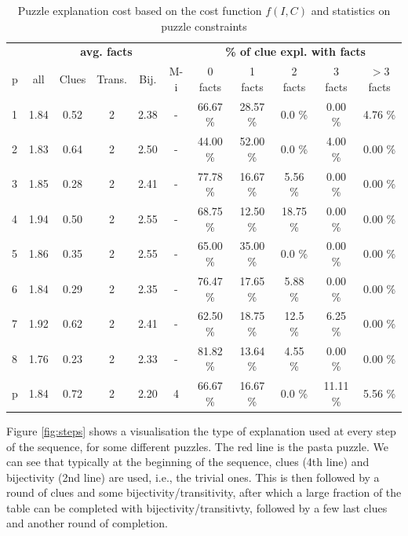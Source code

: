 \begin{table}
	\centering
\begin{tabular}{l|ccccc|ccccc}
    & \multicolumn{5}{c|}{\bf avg. facts} & \multicolumn{5}{c}{\bf \% of clue expl. with facts} \\
p & all & Clues & Trans. & Bij. & M-i & 0 facts & 1 facts & 2 facts & 3 facts &  $>$3 facts \\
\hline
1 &      1.84 &        0.52 &           2 &      2.38 &          - &      66.67 \% &      28.57 \% &        0.0 \% &        0.00 \% &         4.76 \% \\
2 &      1.83 &        0.64 &           2 &       2.50 &          - &       44.00 \% &       52.00 \% &        0.0 \% &        4.00 \% &          0.00 \% \\
3 &      1.85 &        0.28 &           2 &      2.41 &          - &      77.78 \% &      16.67 \% &       5.56 \% &        0.00 \% &          0.00 \% \\
4 &      1.94 &         0.50 &           2 &      2.55 &          - &      68.75 \% &       12.50 \% &      18.75 \% &        0.00 \% &          0.00 \% \\
5 &      1.86 &        0.35 &           2 &      2.55 &          - &       65.00 \% &       35.00 \% &        0.0 \% &        0.00 \% &          0.00 \% \\
6 &      1.84 &        0.29 &           2 &      2.35 &          - &      76.47 \% &      17.65 \% &       5.88 \% &        0.00 \% &          0.00 \% \\
7 &      1.92 &        0.62 &           2 &      2.41 &          - &       62.50 \% &      18.75 \% &       12.5 \% &       6.25 \% &          0.00 \% \\
8 &      1.76 &        0.23 &           2 &      2.33 &          - &      81.82 \% &      13.64 \% &       4.55 \% &        0.00 \% &          0.00 \% \\
p &      1.84 &        0.72 &           2 &       2.20 &          4 &      66.67 \% &      16.67 \% &        0.0 \% &      11.11 \% &         5.56 \% \\
\end{tabular}
\caption{Puzzle explanation cost based on the cost function $f(I, C)$ and statistics on puzzle constraints}
\label{table:sequence_leve}
\end{table}

 Figure \ref{fig:steps} shows a visualisation the type of explanation used at every step of the sequence, for some different puzzles. The red line is the pasta puzzle. We can see that typically at the beginning of the sequence, clues (4th line) and bijectivity (2nd line) are used, i.e., the trivial ones. This is then followed by a round of clues and some bijectivity/transitivity, after which a large fraction of the table can be completed with bijectivity/transitivty, followed by a few last clues and another round of completion.

